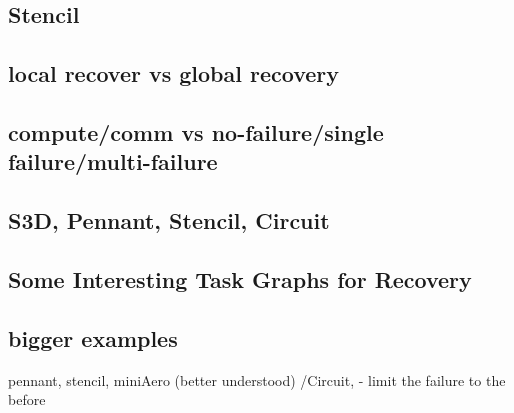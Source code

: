 \subsection{Stencil}



\subsection{local recover vs global recovery}

\subsection{compute/comm vs no-failure/single failure/multi-failure}

\subsection{S3D, Pennant, Stencil, Circuit}

\subsection{Some Interesting Task Graphs for Recovery}

\subsection{bigger examples}
pennant, stencil, miniAero (better understood) /Circuit, 
- limit the failure to the before


